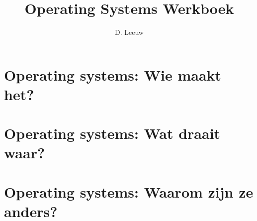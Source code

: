 \documentclass[a4paper,12pt,twoside,titlepage]{article}
\author{D. Leeuw}
\title{Operating Systems Werkboek}
\date{\today\\
0.0.0
\vfill
\raggedright
\copyright\ 2025 Dennis Leeuw\\
}
\begin{document}

\maketitle



\section{Operating systems: Wie maakt het?}


\section{Operating systems: Wat draait waar?}


\section{Operating systems: Waarom zijn ze anders?}



\printindex
\end{document}
